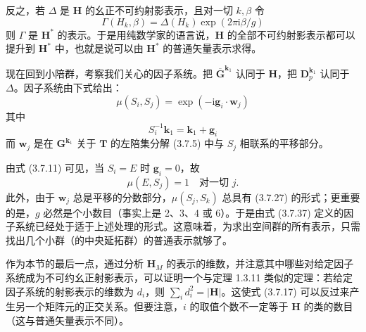 反之，若 $\Delta$ 是 $\mathbf{H}$ 的幺正不可约射影表示，且对一切 $k, \beta$ 令
\begin{equation*}
\Gamma(H_{k}, \beta) = \Delta(H_{k})\exp(2\pi\mathrm{i}\beta/g)
\tag{3.7.36}
\end{equation*}
则 $\Gamma$ 是 $\mathbf{H}^{*}$ 的表示。于是用纯数学家的语言说，$\mathbf{H}$ 的全部不可约射影表示都可以提升到 $\mathbf{H}^{*}$ 中，也就是说可以由 $\mathbf{H}^{*}$ 的普通矢量表示求得。

现在回到小陪群，考察我们关心的因子系统。把 $\overline{\mathbf{G}}^{\mathbf{k}_{1}}$ 认同于 $\mathbf{H}$，把 $\mathbf{D}^{\mathbf{k}_{1}}_{p}$ 认同于 $\Delta$。因子系统由下式给出：
\begin{equation*}
\mu(S_{i}, S_{j}) = \exp(-\mathrm{i}\mathbf{g}_{i} \cdot \mathbf{w}_{j})
\tag{3.7.37}
\end{equation*}
其中
\begin{equation*}
S^{-1}_{i}\mathbf{k}_{1} = \mathbf{k}_{1} + \mathbf{g}_{i}
\tag{3.7.11}
\end{equation*}
而 $\mathbf{w}_{j}$ 是在 $\mathbf{G}^{\mathbf{k}_{1}}$ 关于 $\mathbf{T}$ 的左陪集分解 (3.7.5) 中与 $S_{j}$ 相联系的平移部分。

由式 (3.7.11) 可见，当 $S_{i} = E$ 时 $\mathbf{g}_{i} = 0$，故
\begin{equation*}
\mu(E, S_{j}) = 1 \quad\text{对一切 } j.
\end{equation*}
此外，由于 $\mathbf{w}_{j}$ 总是平移的分数部分，$\mu(S_{j}, S_{k})$ 总具有 (3.7.27) 的形式；更重要的是，$g$ 必然是个小数目（事实上是 2、3、4 或 6）。于是由式 (3.7.37) 定义的因子系统已经处于适于上述处理的形式。这意味着，为求出空间群的所有表示，只需找出几个小群（的中央延拓群）的普通表示就够了。

作为本节的最后一点，通过分析 $\mathbf{H}_{M}$ 的表示的维数，并注意其中哪些对给定因子系统成为不可约幺正射影表示，可以证明一个与定理 1.3.11 类似的定理：若给定因子系统的射影表示的维数为 $d_{i}$，则 $\sum_{i}d^{2}_{i} = |\mathbf{H}|$。这使式 (3.7.17) 可以反过来产生另一个矩阵元的正交关系。但要注意，$i$ 的取值个数不一定等于 $\mathbf{H}$ 的类的数目（这与普通矢量表示不同）。
